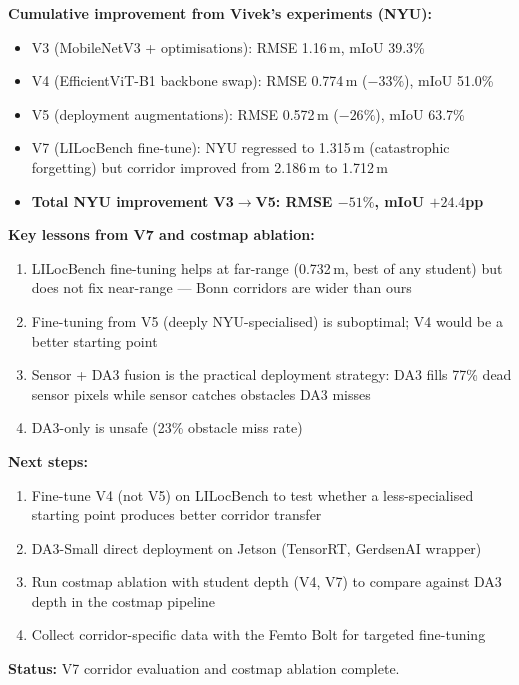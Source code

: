 \documentclass[11pt,a4paper]{article}
\begin{document}
\textbf{Cumulative improvement from Vivek's experiments (NYU):}
\begin{itemize}[nosep]
  \item V3 (MobileNetV3 + optimisations): RMSE 1.16\,m, mIoU 39.3\%
  \item V4 (EfficientViT-B1 backbone swap): RMSE 0.774\,m ($-33\%$), mIoU 51.0\%
  \item V5 (deployment augmentations): RMSE 0.572\,m ($-26\%$), mIoU 63.7\%
  \item V7 (LILocBench fine-tune): NYU regressed to 1.315\,m (catastrophic forgetting)
    but corridor improved from 2.186\,m to 1.712\,m
  \item \textbf{Total NYU improvement V3$\to$V5: RMSE $-51\%$, mIoU $+24.4$pp}
\end{itemize}

\textbf{Key lessons from V7 and costmap ablation:}
\begin{enumerate}[nosep]
  \item LILocBench fine-tuning helps at far-range (0.732\,m, best of any student)
    but does not fix near-range --- Bonn corridors are wider than ours
  \item Fine-tuning from V5 (deeply NYU-specialised) is suboptimal; V4 would
    be a better starting point
  \item Sensor + DA3 fusion is the practical deployment strategy: DA3 fills
    77\% dead sensor pixels while sensor catches obstacles DA3 misses
  \item DA3-only is unsafe (23\% obstacle miss rate)
\end{enumerate}

\textbf{Next steps:}
\begin{enumerate}[nosep]
  \item Fine-tune V4 (not V5) on LILocBench to test whether a less-specialised
    starting point produces better corridor transfer
  \item DA3-Small direct deployment on Jetson (TensorRT, GerdsenAI wrapper)
  \item Run costmap ablation with student depth (V4, V7) to compare against
    DA3 depth in the costmap pipeline
  \item Collect corridor-specific data with the Femto Bolt for targeted fine-tuning
\end{enumerate}

\textbf{Status:} V7 corridor evaluation and costmap ablation complete.

\end{document}
